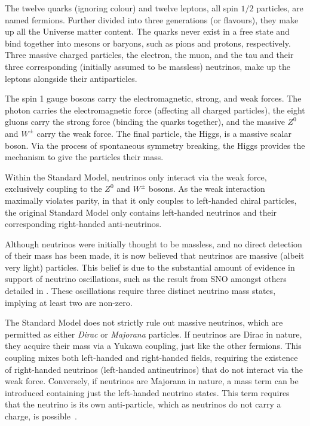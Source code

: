 The twelve quarks (ignoring colour) and twelve leptons, all spin $1/2$ particles, are named
fermions. Further divided into three generations (or flavours), they make up all the Universe
matter content. The quarks never exist in a free state and bind together into mesons or baryons,
such as pions and protons, respectively. Three massive charged particles, the electron, the muon,
and the tau and their three corresponding (initially assumed to be massless) neutrinos, make up
the leptons alongside their antiparticles.

The spin 1 gauge bosons carry the electromagnetic, strong, and weak forces. The photon carries the
electromagnetic force (affecting all charged particles), the eight gluons carry the strong force
(binding the quarks together), and the massive $Z^{0}$ and $W^{\pm}$ carry the weak force. The
final particle, the Higgs, is a massive scalar boson. Via the process of spontaneous symmetry
breaking, the Higgs provides the mechanism to give the particles their mass.

Within the Standard Model, neutrinos only interact via the weak force, exclusively coupling to the
$Z^{0}$ and $W^{\pm}$ bosons. As the weak interaction maximally violates parity, in that it only
couples to left-handed chiral particles, the original Standard Model only contains left-handed
neutrinos and their corresponding right-handed anti-neutrinos.

Although neutrinos were initially thought to be massless, and no direct detection of their mass
has been made, it is now believed that neutrinos are massive (albeit very light) particles. This
belief is due to the substantial amount of evidence in support of neutrino oscillations, such as
the result from SNO amongst others detailed in . These oscillations
require three distinct neutrino mass states, implying at least two are non-zero.

The Standard Model does not strictly rule out massive neutrinos, which are permitted as either
\emph{Dirac} or \emph{Majorana} particles. If neutrinos are Dirac in nature, they acquire their
mass via a Yukawa coupling, just like the other fermions. This coupling mixes both left-handed and
right-handed fields, requiring the existence of right-handed neutrinos (left-handed antineutrinos)
that do not interact via the weak force. Conversely, if neutrinos are Majorana in nature, a mass
term can be introduced containing just the left-handed neutrino states. This term requires that
the neutrino is its own anti-particle, which as neutrinos do not carry a charge, is
possible~\cite{particle2020}.

